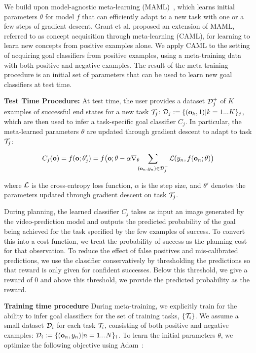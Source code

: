 We build upon model-agnostic meta-learning (MAML)~\cite{maml}, which learns initial parameters $\theta$ for model $f$ that can efficiently adapt to a new task with one or a few steps of gradient descent. Grant et al. \cite{caml} proposed an extension of MAML, referred to as concept acquisition through meta-learning (CAML), for learning to learn new concepts from positive examples alone. We apply CAML to the setting of acquiring goal classifiers from positive examples, using a meta-training data with both positive and negative examples. The result of the meta-training procedure is an initial set of parameters that can be used to learn new goal classifiers at test time.

\noindent \textbf{Test Time Procedure:}
At test time, the user provides a dataset $\mathcal{D}^+_j$ of $K$ examples of successful end states for a new task $\mathcal{T}_j$: $\mathcal{D}_j:=\{(\mathbf{o}_k, 1) | k = 1...K\}_j$, which are then used to infer a task-specific goal classifier $C_j$. In particular, the meta-learned parameters $\theta$ are updated through gradient descent to adapt to task $\mathcal{T}_j$:

$$
C_j(\mathbf{o})
= f(\mathbf{o}; \theta_j')
= f\big(\mathbf{o}; \theta-\alpha \nabla_\theta \!\!\! \sum_{(\mathbf{o}_n, y_n)\in \mathcal{D}^+_j} \mathcal{L} (y_n, f(\mathbf{o}_n; \theta)\big)
$$

where $\mathcal{L}$ is the cross-entropy loss function, $\alpha$ is the step size, and $\theta'$ denotes the parameters updated through gradient descent on task $\mathcal{T}_j$.

During planning, the learned classifier $C_j$ takes as input an image generated by the video-prediction model and outputs the predicted probability of the goal being achieved for the task specified by the few examples of success. To convert this into a cost function, we treat the probability of success as the planning cost for that observation. To reduce the effect of false positives and mis-calibrated predictions, we use the classifier conservatively by thresholding the predictions so that reward is only given for confident successes. Below this threshold, we give a reward of 0 and above this threshold, we provide the predicted probability as the reward.


\noindent \textbf{Training time procedure}
During meta-training, we explicitly train for the ability to infer goal classifiers for the set of training tasks, $\{ \mathcal{T}_i \}$. We assume a small dataset $\mathcal{D}_i$ for each task $\mathcal{T}_i$, consisting of both positive and negative examples: $\mathcal{D}_i:= \{(\mathbf{o}_n,y_n) | n=1...N \}_i$. To learn the initial parameters $\theta$, we optimize the following objective using Adam~\cite{ADAM}:

